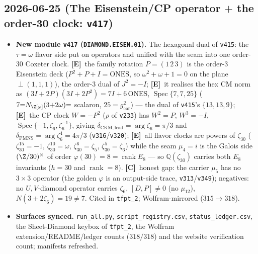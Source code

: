 \documentclass[11pt]{article}
\providecommand{\mE}{\textbf{[E]}}\providecommand{\mC}{\textbf{[C]}}
\providecommand{\vref}[1]{\texttt{#1}}
\providecommand{\gcar}{g_{\mathrm{car}}}\providecommand{\Nfam}{N_{\mathrm{fam}}}
\begin{document}
\subsection*{2026-06-25 (The Eisenstein/CP operator $+$ the order-30 clock: \texttt{v417})}
\begin{itemize}
\item \textbf{New module \texttt{v417} (\texttt{DIAMOND.EISEN.01}).} The hexagonal dual of \vref{v415}:
the $\tau{=}\omega$ flavor side put on operators and unified with the seam into one order-$30$ Coxeter
clock. \mE\ the family rotation $P=(1\,2\,3)$ is the order-$3$ Eisenstein deck ($P^2{+}P{+}I=\mathrm{ONES}$,
so $\omega^2{+}\omega{+}1{=}0$ on the plane $\perp(1,1,1)$), the order-$3$ dual of $J^2{=}{-}I$; \mE\ it
realises the hex CM norm as $(3I{+}2P)(3I{+}2P^2)=7I{+}6\,\mathrm{ONES}$, $\operatorname{Spec}\{7,7,25\}$
($7{=}N_{\Z[\omega]}(3{+}2\omega){=}$ scalaron, $25{=}\gcar^2$) --- the dual of \vref{v415}'s
$\{13,13,9\}$; \mE\ the CP clock $W{=}{-}P^2$ ($\rho$ of \vref{v233}) has $W^2{=}P$, $W^3{=}{-}I$,
$\operatorname{Spec}\{-1,\zeta_6,\zeta_6^{-1}\}$, giving $\delta_{\mathrm{CKM,lead}}{=}\arg\zeta_6{=}\pi/3$
and $\delta_{\mathrm{PMNS}}{=}\arg\zeta_6^4{=}4\pi/3$ (\vref{v316}/\vref{v320}); \mE\ all flavor clocks are
powers of $\zeta_{30}$ ($\zeta_{30}^{15}{=}{-}1$, $\zeta_{30}^{10}{=}\omega$, $\zeta_{30}^{6}{=}\zeta_5$,
$\zeta_{30}^{5}{=}\zeta_6$) while the seam $\mu_4{=}i$ is the Galois side $(\Z/30)^\times$ of order
$\varphi(30){=}8{=}\operatorname{rank}E_8$ --- so $\mathbb Q(\zeta_{30})$ carries both $E_8$ invariants
($h{=}30$ and $\operatorname{rank}{=}8$). \mC\ honest gap: the carrier $\mu_5$ has no $3{\times}3$
operator (the golden $\varphi$ is an output-side trace, \vref{v313}/\vref{v349}); negatives: no
$U,V$-diamond operator carries $\zeta_6$, $[D,P]\neq0$ (no $\mu_{12}$), $N(3{+}2\zeta_6){=}19{\neq}7$.
Cited in \texttt{tfpt\_2}; Wolfram-mirrored ($315\to318$).
\item \textbf{Surfaces synced.} \texttt{run\_all.py}, \texttt{script\_registry.csv},
\texttt{status\_ledger.csv}, the Sheet-Diamond keybox of \texttt{tfpt\_2}, the Wolfram
extension/README/ledger counts ($318/318$) and the website verification count; manifests refreshed.
\end{itemize}
\end{document}
